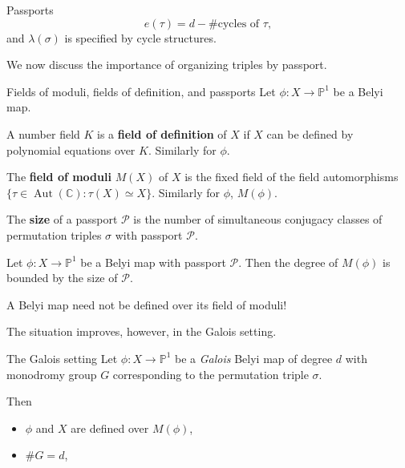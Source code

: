 \documentclass[handout,xcolor=dvipsnames]{beamer}
\theoremstyle{plain}
\newcommand{\PP}{\mathbb P}
\newcommand{\CC}{\mathbb C}
\DeclareMathOperator{\Aut}{Aut}
\begin{document}
{\begin{frame}{Passports}
      $$
      e(\tau) = d-\#\text{cycles of }\tau,
      $$
      and $\lambda(\sigma)$ is specified by cycle structures.
      \pause
      \par
      We now discuss the importance of organizing triples by passport.
    \end{frame}
    \begin{frame}{Fields of moduli, fields of definition, and passports}
      Let $\phi\colon X\to\PP^1$ be a Belyi map.
      \pause\par
      A number field $K$ is a
      \textbf{field of definition} of $X$
      if $X$ can be defined by polynomial
      equations over $K$.
      Similarly for $\phi$.
      \pause\par
      The \textbf{field of moduli}
      $M(X)$
      of $X$ is
      the fixed field of the field
      automorphisms
      $\{\tau\in\Aut(\CC) : \tau(X)\simeq X\}$.
      Similarly for $\phi$, $M(\phi)$.
      \pause\par
      The \textbf{size} of a passport $\mathcal{P}$
      is the number of simultaneous conjugacy classes
      of permutation triples $\sigma$ with passport
      $\mathcal{P}$.
      \pause
      \begin{theorem}
        Let $\phi\colon X\to\PP^1$ be a
        Belyi map with passport $\mathcal{P}$.
        Then the degree of $M(\phi)$ is
        bounded by the size of $\mathcal{P}$.
      \end{theorem}
      \pause
      A Belyi map need not be defined
      over its field of moduli!
      \pause\par
      The situation improves, however,
      in the Galois setting.
    \end{frame}
    \begin{frame}{The Galois setting}
      Let $\phi\colon X\to\PP^1$ be a
      \emph{Galois} Belyi map of degree $d$
      with monodromy group $G$
      corresponding to the permutation triple
      $\sigma$.
      \pause\par
      Then
      \begin{itemize}
        \item
          $\phi$ and $X$ are defined over $M(\phi)$,
        \item
          $\#G = d$,

\end{itemize}
\end{frame}}
\end{document}
